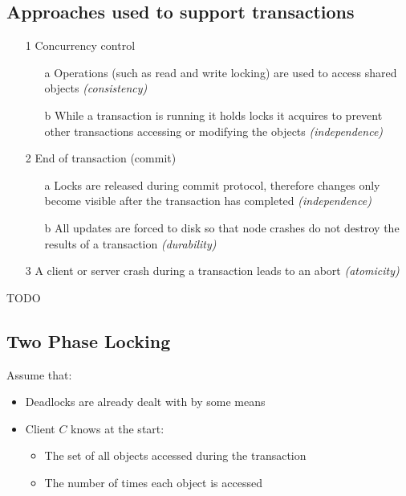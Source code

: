 \documentclass[a4paper]{article}
\begin{document}
\subsection{Approaches used to support transactions}

\begin{enumerate}
  \item[1] Concurrency control
    \begin{enumerate}
      \item[a] Operations (such as read and write locking) are used to access
               shared objects \textit{(consistency)}
      \item[b] While a transaction is running it holds locks it acquires to
               prevent other transactions accessing or modifying the objects
               \textit{(independence)}
    \end{enumerate}

  \item[2] End of transaction (commit)
    \begin{enumerate}
      \item[a] Locks are released during commit protocol, therefore changes only
               become visible after the transaction has completed
               \textit{(independence)}
      \item[b] All updates are forced to disk so that node crashes do not
               destroy the results of a transaction \textit{(durability)}
    \end{enumerate}

  \item[3] A client or server crash during a transaction leads to an abort
           \textit{(atomicity)}
\end{enumerate}

TODO

\subsection{Two Phase Locking}

Assume that:

\begin{itemize}
  \item Deadlocks are already dealt with by some means
  \item Client $C$ knows at the start:
    \begin{itemize}
      \item The set of all objects accessed during the transaction
      \item The number of times each object is accessed
    \end{itemize}
\end{itemize}
\end{document}
